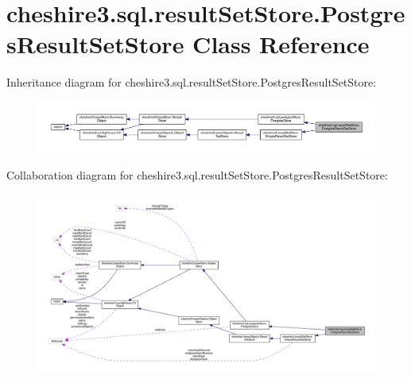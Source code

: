 \hypertarget{classcheshire3_1_1sql_1_1result_set_store_1_1_postgres_result_set_store}{\section{cheshire3.\-sql.\-result\-Set\-Store.\-Postgres\-Result\-Set\-Store Class Reference}
\label{classcheshire3_1_1sql_1_1result_set_store_1_1_postgres_result_set_store}
}


Inheritance diagram for cheshire3.\-sql.\-result\-Set\-Store.\-Postgres\-Result\-Set\-Store\-:
\nopagebreak
\begin{figure}[H]
\begin{center}
\leavevmode
\includegraphics[width=350pt]{classcheshire3_1_1sql_1_1result_set_store_1_1_postgres_result_set_store__inherit__graph}
\end{center}
\end{figure}


Collaboration diagram for cheshire3.\-sql.\-result\-Set\-Store.\-Postgres\-Result\-Set\-Store\-:
\nopagebreak
\begin{figure}[H]
\begin{center}
\leavevmode
\includegraphics[width=350pt]{classcheshire3_1_1sql_1_1result_set_store_1_1_postgres_result_set_store__coll__graph}
\end{center}
\end{figure}
